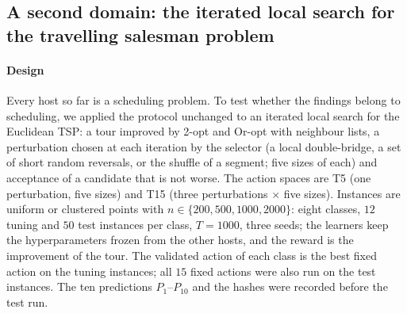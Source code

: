 \subsection{A second domain: the iterated local search for the travelling salesman problem}
\label{sec:tsp}
\paragraph{Design} Every host so far is a scheduling problem. To test whether the findings belong to scheduling, we applied the protocol unchanged to an iterated local search for the Euclidean TSP: a tour improved by 2-opt and Or-opt with neighbour lists, a perturbation chosen at each iteration by the selector (a local double-bridge, a set of short random reversals, or the shuffle of a segment; five sizes of each) and acceptance of a candidate that is not worse. The action spaces are T5 (one perturbation, five sizes) and T15 (three perturbations $\times$ five sizes). Instances are uniform or clustered points with $n\in\{200,500,1000,2000\}$: eight classes, $12$ tuning and $50$ test instances per class, $T=1000$, three seeds; the learners keep the hyperparameters frozen from the other hosts, and the reward is the improvement of the tour. The validated action of each class is the best fixed action on the tuning instances; all $15$ fixed actions were also run on the test instances. The ten predictions $P_1$--$P_{10}$ and the hashes were recorded before the test run.

